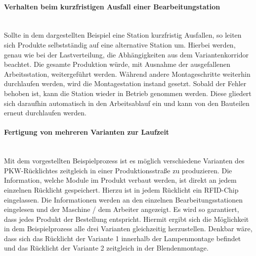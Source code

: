 \paragraph{Verhalten beim kurzfristigen Ausfall einer Bearbeitungstation} \hfill
\\
Sollte in dem dargestellten Beispiel eine Station kurzfristig Ausfallen, so
leiten sich Produkte selbstständig auf eine alternative Station um. Hierbei 
werden, genau wie bei der Lastverteilung, die Abhängigkeiten aus dem
Variantenkorridor beachtet. Die gesamte Produktion würde, mit Ausnahme der
ausgefallenen Arbeitsstation, weitergeführt werden. Während andere
Montageschritte weiterhin durchlaufen werden, wird die Montagestation instand
gesetzt. Sobald der Fehler behoben ist, kann die Station wieder in Betrieb
genommen werden. Diese gliedert sich daraufhin automatisch in den Arbeitsablauf
ein und kann von den Bauteilen erneut durchlaufen werden.

\paragraph{Fertigung von mehreren Varianten zur Laufzeit} \hfill \\
Mit dem vorgestellten Beispielprozess ist es möglich verschiedene Varianten des
PKW-Rücklichtes zeitgleich in einer Produktionsstraße zu produzieren. Die
Information, welche Module im Produkt verbaut werden, ist direkt an jedem
einzelnen Rücklicht gespeichert. Hierzu ist in jedem Rücklicht ein RFID-Chip
eingelassen. Die Informationen werden an den einzelnen Bearbeitungsstationen
eingelesen und der Maschine / dem Arbeiter angezeigt. Es wird so garantiert,
dass jedes Produkt der Bestellung entspricht. Hiermit ergibt sich die
Möglichkeit in dem Beispielprozess alle drei Varianten gleichzeitig
herzustellen. Denkbar wäre, dass sich das Rücklicht der Variante 1 innerhalb
der Lampenmontage befindet und das Rücklicht der Variante 2 zeitgleich in der
Blendenmontage.

